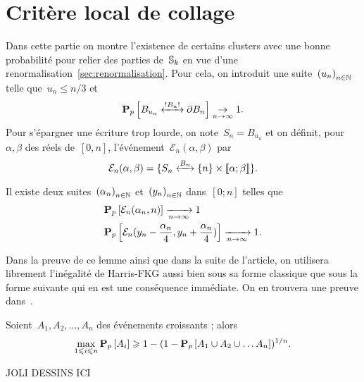 \section{Critère local de collage}
Dans cette partie on montre l'existence de certains clusters avec une bonne probabilité pour relier des parties de~$\mathbb{S}_k$ en vue d'une renormalisation~\ref{sec:renormalisation}. Pour cela, on introduit une suite~$\suite{u}$ telle que~$u_n \leqslant n/3$ et %
	\[
		\Pp{\relie*[B_n]{B_{u_n}}{\partial B_n}} \underset{n \to \infty}{\to} 1.
	\] 
	Pour s'épargner une écriture trop lourde, on note~$S_n = B_{u_n}$ et on définit, pour~$\alpha, \beta$ des réels de~$[0, n]$, l'événement~$\mathcal{E}_n(\alpha, \beta)$ par
	\[
		\mathcal{E}_n( \alpha, \beta ) = \{\relie[B_n]{S_n}{\{n\} \times \llbracket \alpha ; \beta \rrbracket} \}.
	\]
	
	\begin{lem}\label{lem:collagesElem} 
		Il existe deux suites~$\suite{\alpha}$ et~$\suite{y}$ dans~$[0; n]$ telles que
		\begin{align*}
			  &\bm{\mathrm{P}}_{p}\left[\mathcal{E}_n(\alpha_n, n)\right] \xrightarrow[n\to\infty]{} 1 \\ 
			  &\bm{\mathrm{P}}_{p}\left[\mathcal{E}_n(y_n - \frac{\alpha_n}{4}, y_n + \frac{\alpha_n}{4})\right] \xrightarrow[n \to \infty]{} 1.
		\end{align*}
	\end{lem}
	Dans la preuve de ce lemme ainsi que dans la suite de l'article, on utilisera librement l'inégalité de Harris-FKG aussi bien sous sa forme classique que sous la forme suivante qui en est une conséquence immédiate. On en trouvera une preuve dans~\cite{Grimmett}. 
	\begin{lem}\label{lem:HarrisFKG}
		Soient~$A_1, A_2, \ldots, A_n$ des événements croissants ; alors
		\[
			\max_{1 \leqslant i \leqslant n} \bm{\mathrm{P}}_{p}\left[A_i\right] \geqslant 1 - (1 - \bm{\mathrm{P}}_{p}\left[A_1 \cup A_2 \cup \ldots A_n\right])^{1/n}. 
		\]
	\end{lem}
	
	JOLI DESSINS ICI %

